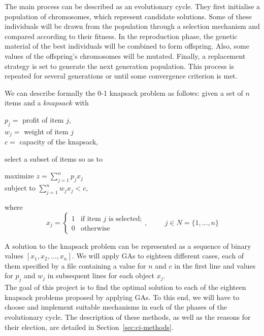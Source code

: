 \documentclass[anon]{CI}
\begin{document}
The main process can be described as an evolutionary cycle. They first initialise a population of chromosomes, which represent candidate solutions. Some of these individuals will be drawn from the population through a selection mechanism and compared according to their fitness. In the reproduction phase, the genetic material of the best individuals will be combined to form offspring. Also, some values of the offspring’s chromosomes will be mutated. Finally, a replacement strategy is set to generate the next generation population. This process is repeated for several generations or until some convergence criterion is met.

We can describe formally the 0-1 knapsack problem as follows: given a set of $n$ items and a $knapsack$ with
\begin{center}
    $p_j = $ profit of item $j$, \\
    $w_j = $ weight of item $j$ \\
    $c = $ capacity of the knapsack, \\
\end{center}
select a subset of items so as to \\
\begin{center}
    maximize $z = \displaystyle \sum_{j=1}^n p_j x_j$ \\
    subject to $\displaystyle \sum_{j=1}^n w_j x_j < c,$ \\
\end{center}
where
$$x_j =     
    \begin{cases}
      1 & \text{if item $j$ is selected;}\\
      0 & \text{otherwise}
    \end{cases}, \hspace{1cm}
j \in N = \{1,..., n\}
$$


A solution to the knapsack problem can be represented as a sequence of binary values $[x_1, x_2, ..., x_n]$. We will apply GAs to eighteen different cases, each of them specified by a file containing a value for $n$ and $c$ in the first line and values for $p_j$ and $w_j$ in subsequent lines for each object $x_j$. \\

The goal of this project is to find the optimal solution to each of the eighteen knapsack problems proposed by applying GAs. To this end, we will have to choose and implement suitable mechanisms in each of the phases of the evolutionary cycle. The description of these methods, as well as the reasons for their election, are detailed in Section~\ref{sec:ci-methods}.
\end{document}
